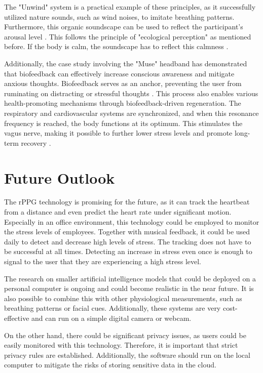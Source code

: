The "Unwind" system is a practical example of these principles, as it successfully utilized nature sounds, such as wind noises, to imitate breathing patterns. Furthermore, this organic soundscape can be used to reflect the participant's arousal level \cite{yu2018unwind}. This follows the principle of "ecological perception" as mentioned before. If the body is calm, the soundscape has to reflect this calmness \cite{dubus2013systematic}.

Additionally, the case study involving the "Muse" headband has demonstrated that biofeedback can effectively increase conscious awareness and mitigate anxious thoughts. Biofeedback serves as an anchor, preventing the user from ruminating on distracting or stressful thoughts \cite{app7121280}. This process also enables various health-promoting mechanisms through biofeedback-driven regeneration. The respiratory and cardiovascular systems are synchronized, and when this resonance frequency is reached, the body functions at its optimum. This stimulates the vagus nerve, making it possible to further lower stress levels and promote long-term recovery \cite{lehrer2014heart}.

\section{Future Outlook}

The rPPG technology is promising for the future, as it can track the heartbeat from a distance and even predict the heart rate under significant motion. Especially in an office environment, this technology could be employed to monitor the stress levels of employees. Together with musical feedback, it could be used daily to detect and decrease high levels of stress. The tracking does not have to be successful at all times. Detecting an increase in stress even once is enough to signal to the user that they are experiencing a high stress level.

The research on smaller artificial intelligence models that could be deployed on a personal computer is ongoing and could become realistic in the near future. It is also possible to combine this with other physiological measurements, such as breathing patterns or facial cues. Additionally, these systems are very cost-effective and can run on a simple digital camera or webcam.

On the other hand, there could be significant privacy issues, as users could be easily monitored with this technology. Therefore, it is important that strict privacy rules are established. Additionally, the software should run on the local computer to mitigate the risks of storing sensitive data in the cloud.





